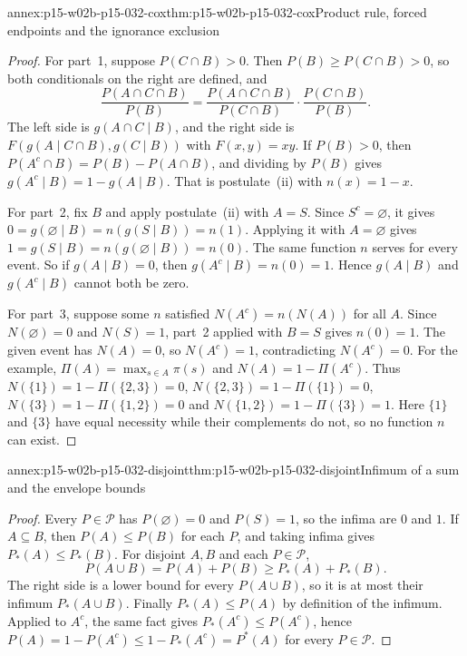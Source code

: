 \begin{annexitem}{annex:p15-w02b-p15-032-cox}{thm:p15-w02b-p15-032-cox}{Product rule, forced endpoints and the ignorance exclusion}
\begin{proof}
For part~1, suppose \(P(C\cap B)>0\). Then \(P(B)\geq P(C\cap B)>0\), so
both conditionals on the right are defined, and
\[
 \frac{P(A\cap C\cap B)}{P(B)}
 =\frac{P(A\cap C\cap B)}{P(C\cap B)}\cdot\frac{P(C\cap B)}{P(B)}.
\]
The left side is \(g(A\cap C\mid B)\), and the right side is
\(F(g(A\mid C\cap B),g(C\mid B))\) with \(F(x,y)=xy\). If \(P(B)>0\), then
\(P(A^c\cap B)=P(B)-P(A\cap B)\), and dividing by \(P(B)\) gives
\(g(A^c\mid B)=1-g(A\mid B)\). That is postulate~(ii) with \(n(x)=1-x\).

For part~2, fix \(B\) and apply postulate~(ii) with \(A=S\). Since
\(S^c=\varnothing\), it gives \(0=g(\varnothing\mid B)=n(g(S\mid B))=n(1)\).
Applying it with \(A=\varnothing\) gives \(1=g(S\mid B)=n(g(\varnothing\mid B))=n(0)\).
The same function \(n\) serves for every event. So if
\(g(A\mid B)=0\), then \(g(A^c\mid B)=n(0)=1\). Hence \(g(A\mid B)\) and
\(g(A^c\mid B)\) cannot both be zero.

For part~3, suppose some \(n\) satisfied \(N(A^c)=n(N(A))\) for all \(A\).
Since \(N(\varnothing)=0\) and \(N(S)=1\), part~2 applied with \(B=S\) gives
\(n(0)=1\). The given event has \(N(A)=0\), so \(N(A^c)=1\), contradicting
\(N(A^c)=0\). For the example, \(\Pi(A)=\max_{s\in A}\pi(s)\) and
\(N(A)=1-\Pi(A^c)\). Thus \(N(\{1\})=1-\Pi(\{2,3\})=0\),
\(N(\{2,3\})=1-\Pi(\{1\})=0\), \(N(\{3\})=1-\Pi(\{1,2\})=0\) and
\(N(\{1,2\})=1-\Pi(\{3\})=1\). Here \(\{1\}\) and \(\{3\}\) have equal
necessity while their complements do not, so no function \(n\) can exist.
\end{proof}\end{annexitem}

\begin{annexitem}{annex:p15-w02b-p15-032-disjoint}{thm:p15-w02b-p15-032-disjoint}{Infimum of a sum and the envelope bounds}
\begin{proof}
Every \(P\in\mathcal P\) has \(P(\varnothing)=0\) and \(P(S)=1\), so the
infima are \(0\) and \(1\). If \(A\subseteq B\), then \(P(A)\leq P(B)\) for
each \(P\), and taking infima gives \(P_*(A)\leq P_*(B)\). For disjoint
\(A,B\) and each \(P\in\mathcal P\),
\[
 P(A\cup B)=P(A)+P(B)\geq P_*(A)+P_*(B).
\]
The right side is a lower bound for every \(P(A\cup B)\), so it is at most
their infimum \(P_*(A\cup B)\). Finally \(P_*(A)\leq P(A)\) by definition of
the infimum. Applied to \(A^c\), the same fact gives \(P_*(A^c)\leq P(A^c)\),
hence \(P(A)=1-P(A^c)\leq1-P_*(A^c)=P^*(A)\) for every \(P\in\mathcal P\).
\end{proof}\end{annexitem}

